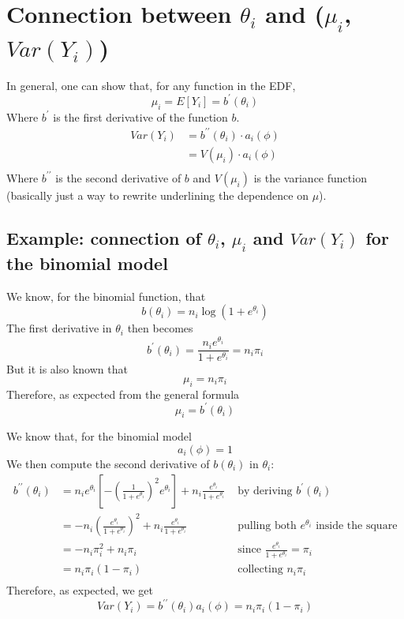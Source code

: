   \section{Connection between $\theta_i$ and ($\mu_i$, $Var(Y_i)$)}
    In general, one can show that, for any function in the EDF,
    $$\mu_i = E[Y_i] = b^\prime(\theta_i)$$
    Where $b^\prime$ is the first derivative of the function $b$.
    \begin{align*}
    Var(Y_i) &= b^{\prime\prime}(\theta_i) \cdot a_i(\phi) \\
             &= V(\mu_i) \cdot a_i(\phi) \\
    \end{align*}
    Where $b^{\prime\prime}$ is the second derivative of $b$ and $V(\mu_i)$ is the variance function (basically just a way to rewrite underlining the dependence on $\mu$).

    \subsection{Example: connection of $\theta_i$, $\mu_i$ and $Var(Y_i)$ for the binomial model}
      We know, for the binomial function, that
      $$b(\theta_i) = n_i\log(1+e^{\theta_i})$$
      The first derivative in $\theta_i$ then becomes
      $$b^\prime(\theta_i) = \frac{n_ie^{\theta_i}}{1+e^{\theta_i}} = n_i\pi_i$$
      But it is also known that
      $$\mu_i = n_i\pi_i$$
      Therefore, as expected from the general formula
      $$\mu_i = b^\prime(\theta_i)$$
      
      We know that, for the binomial model
      $$a_i(\phi) = 1$$
      We then compute the second derivative of $b(\theta_i)$ in $\theta_i$:
      \begin{align*}
      b^{\prime\prime}(\theta_i) 
        &= n_ie^{\theta_i}\left[-\left(\frac{1}{1+e^{\theta_i}}\right)^2e^{\theta_i}\right] + n_i\frac{e^{\theta_i}}{1+e^{\theta_i}}
        & \text{ by deriving } b^\prime(\theta_i)\\
        &= -n_i\left(\frac{e^{\theta_i}}{1+e^{\theta_i}}\right)^2 + n_i\frac{e^{\theta_i}}{1+e^{\theta_i}}
        & \text{ pulling both } e^{\theta_i} \text{ inside the square}\\
        &= -n_i\pi_i^2+n_i\pi_i
        & \text{ since } \frac{e^{\theta_i}}{1+e^{\theta_i}} = \pi_i\\
        &= n_i\pi_i(1-\pi_i)
        & \text{ collecting } n_i\pi_i\\
      \end{align*}
      Therefore, as expected, we get
      $$Var(Y_i) = b^{\prime\prime}(\theta_i)a_i(\phi) = n_i\pi_i(1-\pi_i)$$

